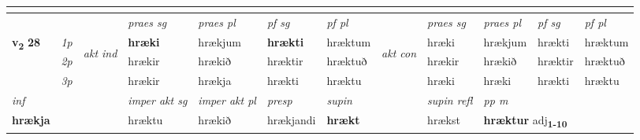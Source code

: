\begin{longtable}[l]{X>{\footnotesize\itshape}llXXXXlXXXX}
\midrule
   
  & \\
   \midrule
 & &   & \textit{praes sg}  & \textit{praes pl}    & \textit{ pf sg} & \textit{pf pl} & & \textit{praes sg}  & \textit{praes pl}    & \textit{pf sg} & \textit{pf pl }  \\ \cmidrule{4-7} \cmidrule{9-12}
 \multirow{2}{*}{{{\textbf{v{\textsubscript{2}}} \Large{\textbf{28}}}}}  & 1p & \multirow{3}{*}{\begin{turn}{90}\textit{akt ind}\end{turn}} & \textbf{hræki} & hrækjum & \textbf{hrækti} & hræktum & \multirow{3}{*}{\begin{turn}{90}\textit{akt con}\end{turn}} &hræki & hrækjum & hrækti & hræktum\\*
 & 2p &  &  hrækir  & hrækið & hræktir & hræktuð & & hrækir & hrækið & hræktir & hræktuð \\*
 & 3p &  & hrækir & hrækja & hrækti & hræktu & & hræki & hræki& hrækti & hræktu \\*
\cmidrule{4-7} \cmidrule{9-12}

   {\textit{inf}} & &  & \textit{imper akt sg} & \textit{imper akt pl}   & \textit{presp} & \textit{supin} && \textit{supin refl} & \textit{pp m} \\*
  {\textbf{hrækja}} & && hræktu  & hrækið   & hrækjandi &  \textbf{hrækt} && hrækst & \multicolumn{2}{l}{\textbf{hræktur} adj\textbf{\textsubscript{1-10}}} \\*

\midrule


\end{longtable}
